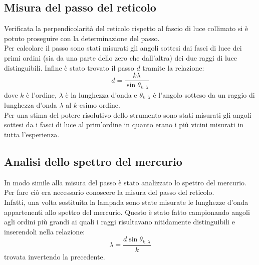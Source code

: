 \documentclass[a4paper,10pt]{article}
\begin{document}
	\subsection{Misura del passo del reticolo}
	Verificata la perpendicolarità del reticolo rispetto al fascio di luce collimato si è potuto proseguire con la determinazione del passo.\\
	Per calcolare il passo sono stati misurati gli angoli sottesi dai fasci di luce dei primi ordini (sia da una parte dello zero che dall'altra) dei due raggi di luce distinguibili. Infine è stato trovato il passo $ d $ tramite la relazione:
	\[ d=\frac{k \lambda}{\sin\theta_{k,\lambda}} \]
	dove $ k $ è l'ordine, $ \lambda $ è la lunghezza d'onda e $ \theta_{k,\lambda} $ è l'angolo sotteso da un raggio di lunghezza d'onda $ \lambda $ al $ k $-esimo ordine.\\
	Per una stima del potere risolutivo dello strumento sono stati misurati gli angoli sottesi da i fasci di luce al prim'ordine in quanto erano i più vicini misurati in tutta l'esperienza.
	\subsection{Analisi dello spettro del mercurio}
	In modo simile alla misura del passo è stato analizzato lo spettro del mercurio. Per fare ciò era necessario conoscere la misura del passo del reticolo. \\
	Infatti, una volta sostituita la lampada sono state misurate le lunghezze d'onda appartenenti allo spettro del mercurio. Questo è stato fatto campionando angoli agli ordini più grandi ai quali i raggi risultavano nitidamente distinguibili e inserendoli nella relazione:
	\[ \lambda =\frac{d\sin\theta_{k,\lambda}}{k} \]
	trovata invertendo la precedente.
\end{document}
